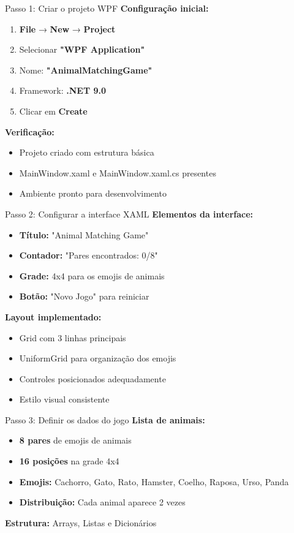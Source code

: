 \documentclass[aspectratio=169]{beamer}
\begin{document}
\begin{frame}{Passo 1: Criar o projeto WPF}
\textbf{Configuração inicial:}
\begin{enumerate}
    \item \textbf{File} → \textbf{New} → \textbf{Project}
    \item Selecionar \textbf{"WPF Application"}
    \item Nome: \textbf{"AnimalMatchingGame"}
    \item Framework: \textbf{.NET 9.0}
    \item Clicar em \textbf{Create}
\end{enumerate}

\textbf{Verificação:}
\begin{itemize}
    \item Projeto criado com estrutura básica
    \item MainWindow.xaml e MainWindow.xaml.cs presentes
    \item Ambiente pronto para desenvolvimento
\end{itemize}
\end{frame}

\begin{frame}{Passo 2: Configurar a interface XAML}
\textbf{Elementos da interface:}
\begin{itemize}
    \item \textbf{Título:} "Animal Matching Game"
    \item \textbf{Contador:} "Pares encontrados: 0/8"
    \item \textbf{Grade:} 4x4 para os emojis de animais
    \item \textbf{Botão:} "Novo Jogo" para reiniciar
\end{itemize}

\textbf{Layout implementado:}
\begin{itemize}
    \item Grid com 3 linhas principais
    \item UniformGrid para organização dos emojis
    \item Controles posicionados adequadamente
    \item Estilo visual consistente
\end{itemize}
\end{frame}

\begin{frame}{Passo 3: Definir os dados do jogo}
\textbf{Lista de animais:}
\begin{itemize}
    \item \textbf{8 pares} de emojis de animais
    \item \textbf{16 posições} na grade 4x4
    \item \textbf{Emojis:} Cachorro, Gato, Rato, Hamster, Coelho, Raposa, Urso, Panda
    \item \textbf{Distribuição:} Cada animal aparece 2 vezes
\end{itemize}

\textbf{Estrutura:} Arrays, Listas e Dicionários
\end{frame}
\end{document}
